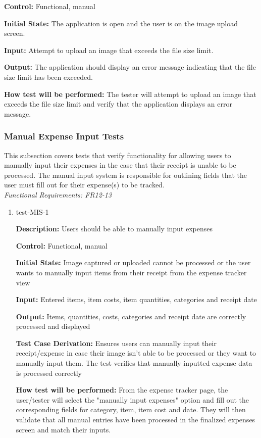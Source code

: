 \documentclass[12pt, titlepage]{article}
\begin{document}
\begin{enumerate}
\textbf{Control:} Functional, manual

\textbf{Initial State:} The application is open and the user is on the image
upload screen.

\textbf{Input:} Attempt to upload an image that exceeds the file size limit.

\textbf{Output:} The application should display an error message indicating that
the file size limit has been exceeded.

\textbf{How test will be performed:} The tester will attempt to upload an image
that exceeds the file size limit and verify that the application displays an
error message.



\end{enumerate}

\subsubsection{Manual Expense Input Tests}

This subsection covers tests that verify functionality for allowing users to manually input their expenses in the case that their receipt is unable to be processed. 
The manual input system is responsible for outlining fields that the user must fill out for their expense(s) to be tracked.\\
\textit{Functional Requirements: FR12-13}

\begin{enumerate}
\item{test-MIS-1\\}

\textbf{Description:} Users should be able to manually input expenses

\textbf{Control:} Functional, manual

\textbf{Initial State:} Image captured or uploaded cannot be processed or the user wants to manually input items from their receipt from the expense tracker view

\textbf{Input:} Entered items, item costs, item quantities, categories and receipt date

\textbf{Output:} Items, quantities, costs, categories and receipt date are correctly processed and displayed 

\textbf{Test Case Derivation:} Ensures users can manually input their receipt/expense in case their image isn't able to be processed or they want to manually input them. The test verifies that manually inputted expense data is processed correctly

\textbf{How test will be performed:} From the expense tracker page, the user/tester will select the "manually input expenses" option and fill out the corresponding fields for category, item, item cost and date. They will then validate that all manual entries have been processed in the finalized expenses screen and match their inputs.	

\end{enumerate}
\end{document}
